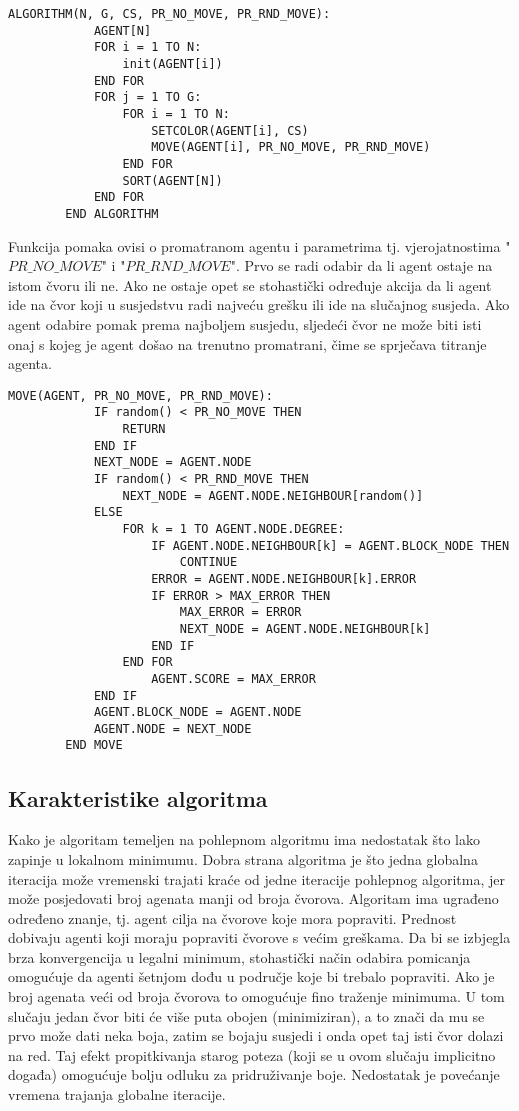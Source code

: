 \documentclass[times, utf8, diplomski, numeric]{fer}
\begin{document}
\begin{singlespace}
	\begin{lstlisting}[caption=Pseudok\^{o}d agentskog algoritma]
		ALGORITHM(N, G, CS, PR_NO_MOVE, PR_RND_MOVE):
			AGENT[N]
			FOR i = 1 TO N:
				init(AGENT[i])
			END FOR
			FOR j = 1 TO G:
				FOR i = 1 TO N:
					SETCOLOR(AGENT[i], CS)
					MOVE(AGENT[i], PR_NO_MOVE, PR_RND_MOVE)
				END FOR
				SORT(AGENT[N])
			END FOR
		END ALGORITHM
	\end{lstlisting}
\end{singlespace}

Funkcija pomaka ovisi o promatranom agentu i parametrima tj. vjerojatnostima "$PR\_NO\_MOVE$" i "$PR\_RND\_MOVE$". Prvo se radi odabir da li agent ostaje na istom čvoru ili ne. Ako ne ostaje opet se stohastički određuje akcija da li agent ide na čvor koji u susjedstvu radi najveću grešku ili ide na slučajnog susjeda. Ako agent odabire pomak prema najboljem susjedu, sljedeći čvor ne može biti isti onaj s kojeg je agent došao na trenutno promatrani, čime se sprječava titranje agenta.

\begin{singlespace}
	\begin{lstlisting}[caption=Detalji funkcije pomaka - MOVE]
		MOVE(AGENT, PR_NO_MOVE, PR_RND_MOVE):
			IF random() < PR_NO_MOVE THEN
				RETURN
			END IF
			NEXT_NODE = AGENT.NODE
			IF random() < PR_RND_MOVE THEN
				NEXT_NODE = AGENT.NODE.NEIGHBOUR[random()]
			ELSE
				FOR k = 1 TO AGENT.NODE.DEGREE:
					IF AGENT.NODE.NEIGHBOUR[k] = AGENT.BLOCK_NODE THEN
						CONTINUE
					ERROR = AGENT.NODE.NEIGHBOUR[k].ERROR
					IF ERROR > MAX_ERROR THEN
						MAX_ERROR = ERROR
						NEXT_NODE = AGENT.NODE.NEIGHBOUR[k]
					END IF
				END FOR
					AGENT.SCORE = MAX_ERROR
			END IF
			AGENT.BLOCK_NODE = AGENT.NODE
			AGENT.NODE = NEXT_NODE
		END MOVE
	\end{lstlisting}
\end{singlespace}

\subsection{Karakteristike algoritma}

Kako je algoritam temeljen na pohlepnom algoritmu ima nedostatak što lako zapinje u lokalnom minimumu. Dobra strana algoritma je što jedna globalna iteracija može vremenski trajati kraće od jedne iteracije pohlepnog algoritma, jer može posjedovati broj agenata manji od broja čvorova. Algoritam ima ugrađeno određeno znanje, tj. agent cilja na čvorove koje mora popraviti. Prednost dobivaju agenti koji moraju popraviti čvorove s većim greškama. Da bi se izbjegla brza konvergencija u legalni minimum, stohastički način odabira pomicanja omogućuje da agenti šetnjom dođu u područje koje bi trebalo popraviti. Ako je broj agenata veći od broja čvorova to omogućuje fino traženje minimuma. U tom slučaju jedan čvor biti će više puta obojen (minimiziran), a to znači da mu se prvo može dati neka boja, zatim se bojaju susjedi i onda opet taj isti čvor dolazi na red. Taj efekt propitkivanja starog poteza (koji se u ovom slučaju implicitno događa) omogućuje bolju odluku za pridruživanje boje. Nedostatak je povećanje vremena trajanja globalne iteracije.
\end{document}

